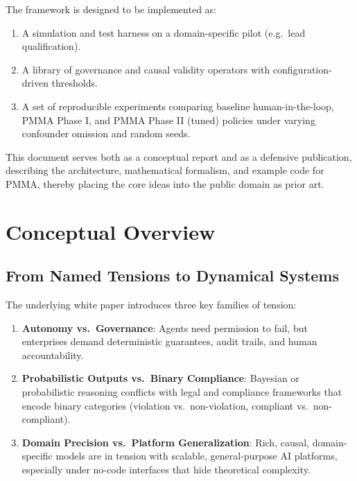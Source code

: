 \documentclass[11pt]{article}
\begin{document}
The framework is designed to be implemented as:
\begin{enumerate}
  \item A simulation and test harness on a domain-specific pilot (e.g.\ lead qualification).
  \item A library of governance and causal validity operators with configuration-driven thresholds.
  \item A set of reproducible experiments comparing baseline human-in-the-loop, PMMA Phase I, and PMMA Phase II (tuned) policies under varying confounder omission and random seeds.
\end{enumerate}

This document serves both as a conceptual report and as a defensive publication, describing the architecture, mathematical formalism, and example code for PMMA, thereby placing the core ideas into the public domain as prior art.

\section{Conceptual Overview}

\subsection{From Named Tensions to Dynamical Systems}

The underlying white paper introduces three key families of tension:
\begin{enumerate}
  \item \textbf{Autonomy vs.\ Governance}: Agents need permission to fail, but enterprises demand deterministic guarantees, audit trails, and human accountability.
  \item \textbf{Probabilistic Outputs vs.\ Binary Compliance}: Bayesian or probabilistic reasoning conflicts with legal and compliance frameworks that encode binary categories (violation vs.\ non-violation, compliant vs.\ non-compliant).
  \item \textbf{Domain Precision vs.\ Platform Generalization}: Rich, causal, domain-specific models are in tension with scalable, general-purpose AI platforms, especially under no-code interfaces that hide theoretical complexity.
\end{enumerate}
\end{document}
